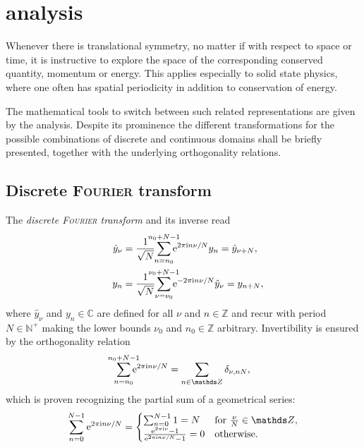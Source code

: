 
\chapter{ analysis}

Whenever there is translational symmetry, no matter if with respect to space or
time, it is instructive to explore the space of the corresponding conserved
quantity, momentum or energy. This applies especially to solid state physics,
where one often has spatial periodicity in addition to conservation of energy.

The mathematical tools to switch between such related representations are given
by the  analysis. Despite its prominence the different
transformations for the possible combinations of discrete and continuous domains
shall be briefly presented, together with the underlying orthogonality
relations.

\section{Discrete \textsc{Fourier} transform}

The \emph{discrete \textsc{Fourier} transform} and its inverse read
%
\begin{align*}
    \hat y_\nu &= \frac 1 {\sqrt N}
    \smashoperator{\sum_{n = n_0}^{n_0 + N - 1}}
    \E^{2 \pi \I n \nu / N} y_n = \hat y_{\nu + N},
    \\
    \quad y_n &= \frac 1 {\sqrt N}
    \smashoperator{\sum_{\nu = \nu_0}^{\nu_0 + N - 1}}
    \E^{-2 \pi \I n \nu / N} \hat y_\nu = y_{n + N},
\end{align*}
%
where $\hat y_\nu$ and $y_n \in \mathds C$ are defined for all $\nu$ and $n \in
\mathds Z$ and recur with period $N \in \mathds N^+$ making the lower bounds
$\nu_0$ and $n_0 \in \mathds Z$ arbitrary. Invertibility is ensured by the
orthogonality relation
%
\begin{equation*}
    \smashoperator{\sum_{n = n_0}^{n_0 + N - 1}} \E^{2 \pi \I n \nu / N} =
    \sum_{n \in \mathds Z} \delta_{\nu, n N},
\end{equation*}
%
which is proven recognizing the partial sum of a geometrical series:
%
\begin{equation*}
    \sum_{n = 0}^{N - 1} \E^{2 \pi \I n \nu / N} =
    \begin{cases}
        \sum_{n = 0}^{N - 1} 1 = N
            & \text{for $\frac \nu N \in \mathds Z$,} \\
        \frac{\E^{2 \pi \I \nu} - 1}{\E^{2 \pi \I n \nu / N} - 1} = 0
            & \text{otherwise.}
    \end{cases}
\end{equation*}

